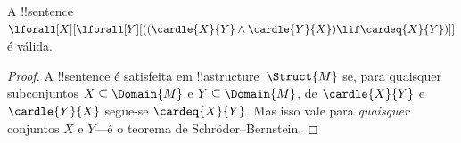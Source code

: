 \documentclass[../../../include/open-logic-section]{subfiles}
\begin{document}
\begin{prop}
A !!{sentence} $\lforall[X][\lforall[Y][((\cardle{X}{Y} \land
    \cardle{Y}{X}) \lif \cardeq{X}{Y})]]$ é válida.
\end{prop}

\begin{proof}
A !!{sentence} é satisfeita em !!a{structure}~$\Struct{M}$ se, para
quaisquer subconjuntos $X \subseteq \Domain{M}$ e
$Y \subseteq \Domain{M}$, de $\cardle{X}{Y}$ e $\cardle{Y}{X}$ segue-se
$\cardeq{X}{Y}$. Mas isso vale para \emph{quaisquer} conjuntos $X$ e
$Y$---é o teorema de Schr\"oder--Bernstein.
\end{proof}
\end{document}
